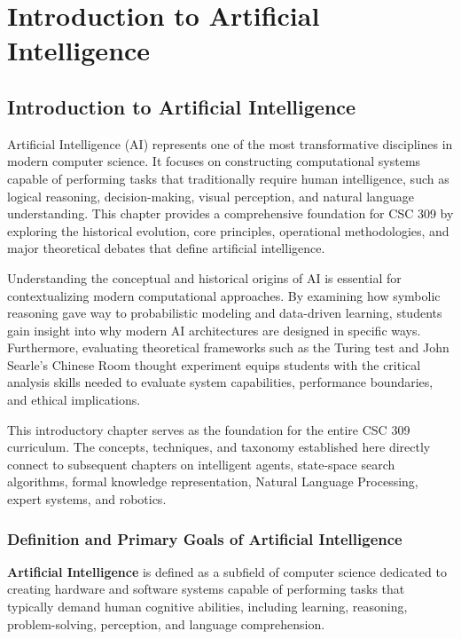 \documentclass[12pt]{report}
\begin{document}
\pagestyle{plain}
\setcounter{chapter}{0}
\chapter{Introduction to Artificial Intelligence}

\section{Introduction to Artificial Intelligence}

Artificial Intelligence (AI) represents one of the most transformative disciplines in modern computer science. It focuses on constructing computational systems capable of performing tasks that traditionally require human intelligence, such as logical reasoning, decision-making, visual perception, and natural language understanding. This chapter provides a comprehensive foundation for CSC 309 by exploring the historical evolution, core principles, operational methodologies, and major theoretical debates that define artificial intelligence.

Understanding the conceptual and historical origins of AI is essential for contextualizing modern computational approaches. By examining how symbolic reasoning gave way to probabilistic modeling and data-driven learning, students gain insight into why modern AI architectures are designed in specific ways. Furthermore, evaluating theoretical frameworks such as the Turing test and John Searle's Chinese Room thought experiment equips students with the critical analysis skills needed to evaluate system capabilities, performance boundaries, and ethical implications.

This introductory chapter serves as the foundation for the entire CSC 309 curriculum. The concepts, techniques, and taxonomy established here directly connect to subsequent chapters on intelligent agents, state-space search algorithms, formal knowledge representation, Natural Language Processing, expert systems, and robotics.

\subsection{Definition and Primary Goals of Artificial Intelligence}

\textbf{Artificial Intelligence} is defined as a subfield of computer science dedicated to creating hardware and software systems capable of performing tasks that typically demand human cognitive abilities, including learning, reasoning, problem-solving, perception, and language comprehension.
\end{document}

